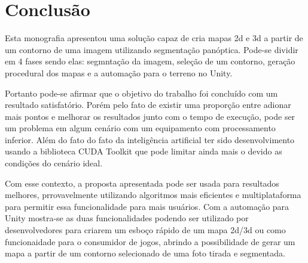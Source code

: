 \section{Conclusão}

Esta monografia apresentou uma solução capaz de cria mapas 2d e 3d a partir de um contorno de uma imagem utilizando segmentação panóptica. Pode-se dividir em 4 fases sendo elas: segmntação da imagem, seleção de um contorno, geração procedural dos mapas e a automação para o terreno no Unity.

Portanto pode-se afirmar que o objetivo do trabalho foi concluído com um resultado satisfatório. Porém pelo fato de existir uma proporção entre adionar mais pontos e melhorar os resultados junto com o tempo de execução, pode ser um problema em algum cenário com um equipamento com processamento inferior. Além do fato do fato da inteligência artificial ter sido desenvolvimento usando a biblioteca CUDA Toolkit que pode limitar ainda mais o devido as condições do cenário ideal.

Com esse contexto, a proposta apresentada pode ser usada para resultados melhores, prrovavelmente utilizando algoritmos mais eficientes e multiplataforma para permitir essa funcionalidade para mais usuários. Com a automação para Unity mostra-se as duas funcionalidades podendo ser utilizado por desenvolvedores para criarem um esboço rápido de um mapa 2d/3d ou como funcionaidade para o consumidor de jogos, abrindo a possibilidade de gerar um mapa a partir de um contorno selecionado de uma foto tirada e segmentada.
